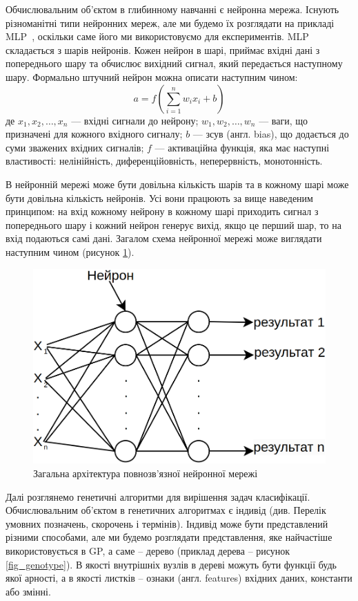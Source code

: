 Обчислювальним об'єктом в глибинному навчанні є нейронна мережа. Існують різноманітні типи нейронних мереж, але ми будемо їх розглядати на прикладі MLP~\cite{ct26}, оскільки саме його ми використовуємо для експериментів. MLP~\cite{ct26} складається з шарів нейронів. Кожен нейрон в шарі, приймає вхідні дані з попереднього шару та обчислює вихідний сигнал, який передається наступному шару. Формально штучний нейрон можна описати наступним чином:
\begin{equation}
\label{eq:neuron}
	a = f\left(\sum_{i=1}^n w_i x_i + b \right)
\end{equation}
де \(x_1, x_2, \ldots, x_n\) — вхідні сигнали до нейрону; \(w_1, w_2, \ldots, w_n\) — ваги, що призначені для кожного вхідного сигналу; \(b\) — зсув (англ. bias), що додається до суми зважених вхідних сигналів; \(f\) — активаційна функція, яка має наступні властивості: нелінійність, диференційовність, неперервність, монотонність. 

В нейронній мережі може бути довільна кількість шарів та в кожному шарі може бути довільна кількість нейронів. Усі вони працюють за вище наведеним принципом: на вхід кожному нейрону в кожному шарі приходить сигнал з попереднього шару і кожний нейрон генерує вихід, якщо це перший шар, то на вхід подаються самі дані. Загалом схема нейронної мережі може виглядати наступним чином (рисунок \ref{fig_nn_arch}).

\begin{figure}[ht]
	\centering
	\includegraphics[scale=0.5]{Images/neural_network_architecture.png}
	\caption{Загальна архітектура повнозв'язної нейронної мережі}
	\label{fig_nn_arch}
\end{figure}

Далі розглянемо генетичні алгоритми для вирішення задач класифікації. Обчислювальним об'єктом в генетичних алгоритмах є індивід (див. Перелік умовних позначень, скорочень і термінів). Індивід може бути представлений різними способами, але ми будемо розглядати представлення, яке найчастіше використовується в GP, а саме -- дерево (приклад дерева -- рисунок \ref{fig_genotype}). В якості внутрішніх вузлів в дереві можуть бути функції будь якої арності, а в якості листків -- ознаки (англ. features) вхідних даних, константи або змінні. 

